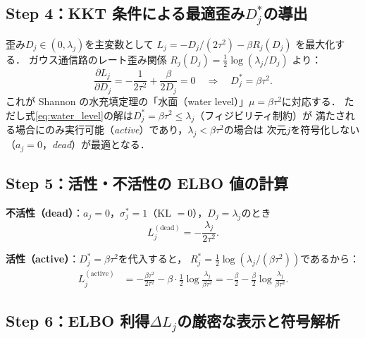 \documentclass[11pt,a4paper]{jsarticle}
\begin{document}
\subsection*{Step 4：KKT 条件による最適歪み$D_j^*$の導出}

歪み$D_j \in (0, \lambda_j)$を主変数として $L_j = -D_j/(2\tau^2) - \beta R_j(D_j)$ を最大化する．
ガウス通信路のレート歪み関係 $R_j(D_j) = \tfrac{1}{2}\log(\lambda_j / D_j)$ より：
\begin{equation}
  \frac{\partial L_j}{\partial D_j}
  = -\frac{1}{2\tau^2} + \frac{\beta}{2 D_j} = 0
  \quad\Longrightarrow\quad
  D_j^{*} = \beta \tau^2.
  \label{eq:water_level}
\end{equation}
これが Shannon の水充填定理\cite{cover2006elements}の「水面（water level）」$\mu = \beta\tau^2$に対応する．
ただし式\eqref{eq:water_level}の解は$D_j^* = \beta\tau^2 \leq \lambda_j$（フィジビリティ制約）が
満たされる場合にのみ実行可能（\textit{active}）であり，$\lambda_j < \beta\tau^2$の場合は
次元$j$を符号化しない（$a_j = 0$，\textit{dead}）が最適となる．

\subsection*{Step 5：活性・不活性の ELBO 値の計算}

\textbf{不活性（dead）}：$a_j = 0$，$\sigma_j^* = 1$（KL $= 0$），$D_j = \lambda_j$のとき
\begin{equation}
  L_j^{(\mathrm{dead})} = -\frac{\lambda_j}{2\tau^2}.
  \label{eq:Lj_dead}
\end{equation}

\textbf{活性（active）}：$D_j^* = \beta\tau^2$を代入すると，
$R_j^* = \tfrac{1}{2}\log(\lambda_j / (\beta\tau^2))$であるから：
\begin{align}
  L_j^{(\mathrm{active})}
  &= -\frac{\beta\tau^2}{2\tau^2} - \beta \cdot \frac{1}{2}\log\frac{\lambda_j}{\beta\tau^2}
   = -\frac{\beta}{2} - \frac{\beta}{2}\log\frac{\lambda_j}{\beta\tau^2}.
  \label{eq:Lj_active}
\end{align}

\subsection*{Step 6：ELBO 利得$\Delta L_j$の厳密な表示と符号解析}
\end{document}
